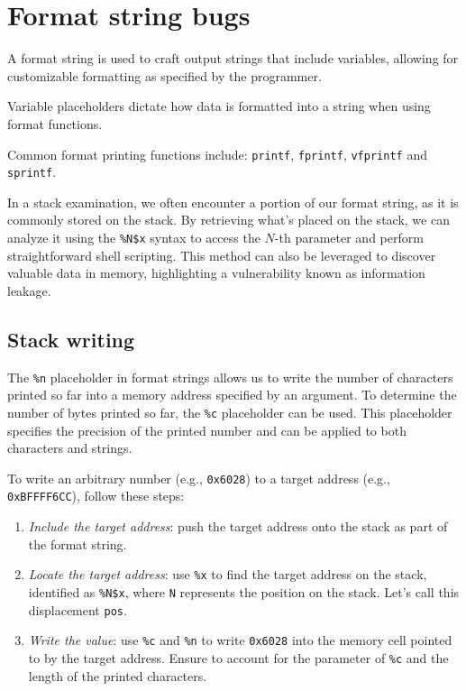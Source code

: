 \section{Format string bugs}

\begin{definition}
    A format string is used to craft output strings that include variables, allowing for customizable formatting as specified by the programmer.
\end{definition}
\begin{definition}
    Variable placeholders dictate how data is formatted into a string when using format functions.
\end{definition}
Common format printing functions include: \texttt{printf}, \texttt{fprintf}, \texttt{vfprintf} and \texttt{sprintf}.

In a stack examination, we often encounter a portion of our format string, as it is commonly stored on the stack.
By retrieving what's placed on the stack, we can analyze it using the \texttt{\%N\$x} syntax to access the $N$-th parameter and perform straightforward shell scripting. 
This method can also be leveraged to discover valuable data in memory, highlighting a vulnerability known as information leakage.

\subsection{Stack writing}
The \texttt{\%n} placeholder in format strings allows us to write the number of characters printed so far into a memory address specified by an argument.
To determine the number of bytes printed so far, the \texttt{\%c} placeholder can be used. 
This placeholder specifies the precision of the printed number and can be applied to both characters and strings.

To write an arbitrary number (e.g., \texttt{0x6028}) to a target address (e.g., \texttt{0xBFFFF6CC}), follow these steps:
\begin{enumerate}
    \item \textit{Include the target address}: push the target address onto the stack as part of the format string.
    \item \textit{Locate the target address}: use \texttt{\%x} to find the target address on the stack, identified as \texttt{\%N\$x}, where \texttt{N} represents the position on the stack. 
        Let's call this displacement \texttt{pos}.
    \item \textit{Write the value}: use \texttt{\%c} and \texttt{\%n} to write \texttt{0x6028} into the memory cell pointed to by the target address.
        Ensure to account for the parameter of \texttt{\%c} and the length of the printed characters.
\end{enumerate}

